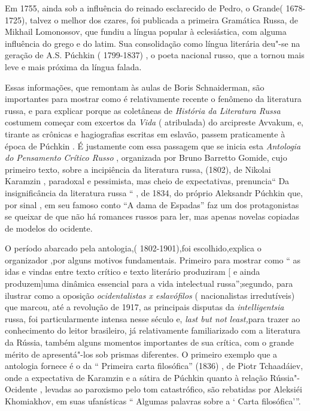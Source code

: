 Em 1755, ainda sob a influência do reinado esclarecido de Pedro, o
Grande( 1678-1725), talvez o melhor dos czares, foi publicada a primeira
Gramática Russa, de Mikhail Lomonossov, que fundiu a língua popular à
eclesiástica, com alguma influência do grego e do latim. Sua
consolidação como língua literária deu"-se na geração de A.S. Púchkin (
1799-1837) , o poeta nacional russo, que a tornou mais leve e mais
próxima da língua falada.

Essas informações, que remontam às aulas de Boris Schnaiderman, são
importantes para mostrar como é relativamente recente o fenômeno da
literatura russa, e para explicar porque as coletâneas de \emph{História
da Literatura Russa} costumem começar com excertos da \emph{Vida} (
atribulada) do arcipreste Avvakum, e, tirante as crônicas e hagiografias
escritas em eslavão, passem praticamente à época de Púchkin . É
justamente com essa passagem que se inicia esta \emph{Antologia do
Pensamento Crítico Russo} , organizada por Bruno Barretto Gomide, cujo
primeiro texto, sobre a incipiência da literatura russa, (1802), de
Nikolai Karamzin , paradoxal e pessimista, mas cheio de expectativas,
prenuncia`` Da insignificância da literatura russa `` , de 1834, do
próprio Aleksandr Púchkin que, por sinal , em seu famoso conto ``A dama
de Espadas'' faz um dos protagonistas se queixar de que não há romances
russos para ler, mas apenas novelas copiadas de modelos do ocidente.

O período abarcado pela antologia,( 1802-1901),foi escolhido,explica o
organizador ,por alguns motivos fundamentais. Primeiro para mostrar como
`` as idas e vindas entre texto crítico e texto literário produziram {[}
e ainda produzem{]}uma dinâmica essencial para a vida intelectual
russa'';segundo, para ilustrar como a oposição \emph{ocidentalistas x
eslavófilos} ( nacionalistas irredutíveis) que marcou, até a revolução
de 1917, as principais disputas da \emph{intelligentsia} russa, foi
particularmente intensa nesse século e, \emph{last but not least,}para
trazer ao conhecimento do leitor brasileiro, já relativamente
familiarizado com a literatura da Rússia, também alguns momentos
importantes de sua crítica, com o grande mérito de apresentá"-los sob
prismas diferentes. O primeiro exemplo que a antologia fornece é o da ``
Primeira carta filosófica'' (1836) , de Piotr Tchaadáiev, onde a
expectativa de Karamzin e a sátira de Púchkin quanto à relação
Rússia"-Ocidente , levadas ao paroxismo pelo tom catastrófico, são
rebatidas por Aleksiéi Khomiakhov, em suas ufanísticas `` Algumas
palavras sobre a ` Carta filosófica'''.

